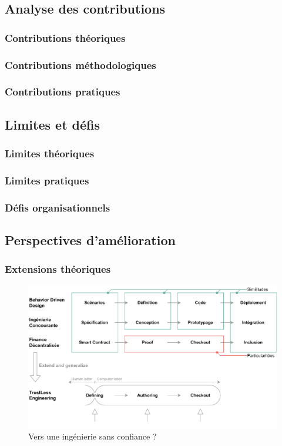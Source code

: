 \documentclass[a4paper,12pt]{article}
\begin{document}
\subsection{Analyse des contributions}
\label{sec:org57c4c15}
\subsubsection{Contributions théoriques}
\label{sec:orgdf492ed}
\subsubsection{Contributions méthodologiques}
\label{sec:org1d4dc1f}
\subsubsection{Contributions pratiques}
\label{sec:orgcacf4d3}
\subsection{Limites et défis}
\label{sec:orga128286}
\subsubsection{Limites théoriques}
\label{sec:orga371b15}
\subsubsection{Limites pratiques}
\label{sec:org3358c3b}
\subsubsection{Défis organisationnels}
\label{sec:orgc69dd2c}
\subsection{Perspectives d'amélioration}
\label{sec:org350ed6b}
\subsubsection{Extensions théoriques}
\label{sec:orgadc6d65}

\begin{figure}[htbp]
\centering
\includegraphics[width=.9\linewidth]{./svg/long-term-goal.pdf}
\caption{\label{fig:org4ef3224}Vers une ingénierie sans confiance ?}
\end{figure}
\end{document}
